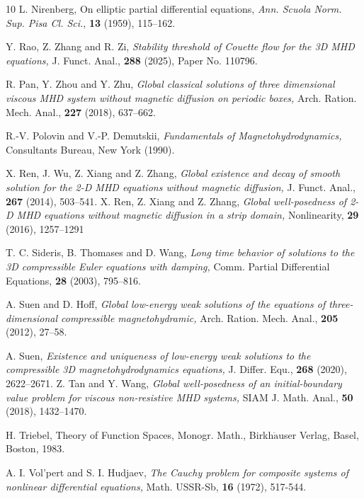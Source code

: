 \documentclass[12pt, reqno]{amsart}
\numberwithin{equation}{section}
\numberwithin{equation}{section}
\numberwithin{equation}{section}
\numberwithin{equation}{section}
\theoremstyle{remark}
\begin{document}
\begin{thebibliography}{10}
 L. Nirenberg, {On elliptic partial
    differential equations}, {\it Ann. Scuola Norm. Sup. Pisa Cl. Sci.}, {\bf
  13} (1959), 115--162.

Y. Rao, Z. Zhang and R. Zi, {\it  Stability threshold of Couette flow for the 3D MHD equations,}  J. Funct. Anal.,  {\bf 288} (2025), Paper No. 110796.

R. Pan, Y. Zhou and Y. Zhu, {\it  Global classical solutions of three dimensional viscous MHD system without magnetic diffusion on periodic boxes,} Arch. Ration. Mech. Anal., {\bf 227} (2018), 637--662.


 R.-V. Polovin and V.-P. Demutskii, {\it Fundamentals of Magnetohydrodynamics,} Consultants Bureau, New York (1990).

 X. Ren, J. Wu, Z. Xiang and Z. Zhang,  {\it Global existence and decay of smooth solution for the 2-D MHD equations without magnetic diffusion,} J. Funct. Anal., {\bf 267} (2014),  503--541.
X. Ren, Z. Xiang and  Z. Zhang,  {\it Global well-posedness of 2-D MHD equations without magnetic diffusion in a strip domain,} Nonlinearity, \textbf{29} (2016),  1257--1291

T. C. Sideris, B. Thomases and  D. Wang, {\it Long time behavior of solutions to the 3D compressible
Euler equations with damping,} Comm. Partial Differential Equations, {\bf 28} (2003), 795--816.



 A. Suen and D. Hoff, {\it Global low-energy weak solutions of the equations of three-dimensional compressible magnetohydramic,} Arch. Ration. Mech. Anal., {\bf 205} (2012), 27--58.


 A. Suen,  {\it Existence and uniqueness of low-energy weak solutions to the compressible 3D magnetohydrodynamics equations,}  J. Differ. Equ.,  {\bf 268} (2020), 2622--2671.
 Z. Tan and  Y. Wang, {\it Global well-posedness of an initial-boundary value problem for viscous non-resistive MHD systems,} SIAM J. Math. Anal., {\bf 50} (2018), 1432--1470.

	H. Triebel, Theory of Function Spaces, Monogr. Math., Birkh$\ddot{\mathrm{a}}$user Verlag, Basel, Boston, 1983.


 A. I. Vol'pert and S. I. Hudjaev, {\it The Cauchy problem for composite systems of nonlinear differential equations,} Math.
USSR-Sb, \textbf{16} (1972), 517-544.



\end{thebibliography}
\end{document}
